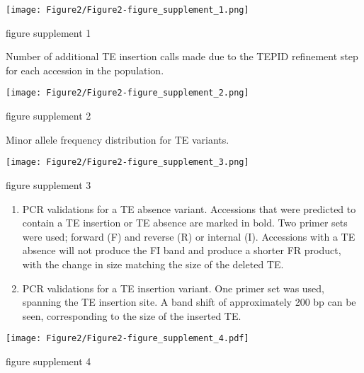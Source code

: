 \documentclass[12pt]{article}
\begin{document}
\pagebreak


\setcounter{suppfigure}{1}
\begin{suppfigure}
  \centering
  \texttt{[image: Figure2/Figure2-figure\_supplement\_1.png]}
  \caption{figure supplement 1}
  \label{fig2s1}
\end{suppfigure}

Number of additional TE insertion calls made due to the TEPID refinement
step for each accession in the population.

\pagebreak
\setcounter{suppfigure}{1}

\begin{suppfigure}
  \centering
  \texttt{[image: Figure2/Figure2-figure\_supplement\_2.png]}
  \caption{figure supplement 2}
  \label{fig2s2}
\end{suppfigure}

Minor allele frequency distribution for TE variants.

\pagebreak
\setcounter{suppfigure}{1}

\begin{suppfigure}
  \centering
  \texttt{[image: Figure2/Figure2-figure\_supplement\_3.png]}
  \caption{figure supplement 3}
  \label{fig2s3}
\end{suppfigure}

\begin{enumerate}
\def\labelenumi{(\Alph{enumi})}
\item
  PCR validations for a TE absence variant. Accessions that were
  predicted to contain a TE insertion or TE absence are marked in bold.
  Two primer sets were used; forward (F) and reverse (R) or internal
  (I). Accessions with a TE absence will not produce the FI band and
  produce a shorter FR product, with the change in size matching the
  size of the deleted TE.
\item
  PCR validations for a TE insertion variant. One primer set was used,
  spanning the TE insertion site. A band shift of approximately 200 bp
  can be seen, corresponding to the size of the inserted TE.
\end{enumerate}

\pagebreak

\setcounter{suppfigure}{1}

\begin{suppfigure}
  \centering
  \texttt{[image: Figure2/Figure2-figure\_supplement\_4.pdf]}
  \caption{figure supplement 4}
  \label{fig2s4}
\end{suppfigure}
\end{document}
